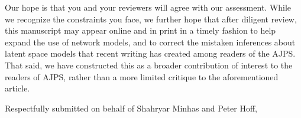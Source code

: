 \documentclass[12pt]{letter}
\begin{document}
\begin{letter}
Our hope is that you and your reviewers will agree with our assessment. While we recognize the constraints you face, we further hope that after diligent review, this manuscript may appear online and in print in a timely fashion to help expand the use of network models, and to correct the mistaken inferences about latent space models that recent writing has created among readers of the AJPS. That said, we have constructed this as a broader contribution of interest to the readers of AJPS, rather than a more limited critique to the aforementioned article.

\closing{Respectfully submitted on behalf of Shahryar Minhas and Peter Hoff,} \vspace{.1in}


\end{letter}
\end{document}
